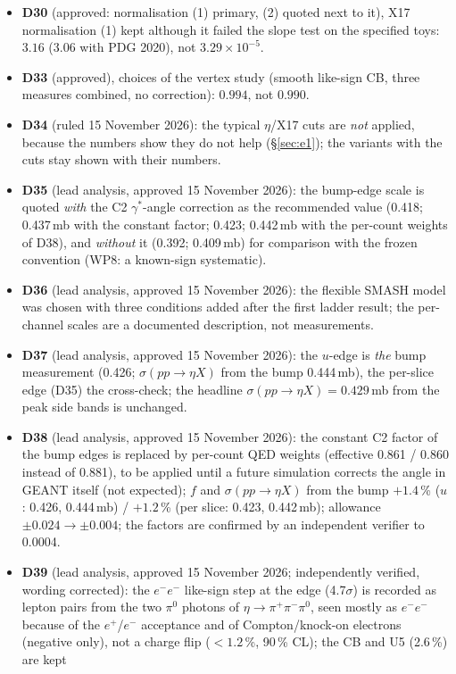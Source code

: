 \documentclass[11pt,a4paper]{article}
\newcommand{\piz}{\ensuremath{\pi^{0}}\xspace}
\newcommand{\pipi}{\ensuremath{\pi^{+}\pi^{-}}\xspace}
\newcommand{\sigeta}{\ensuremath{\sigma(pp\to\eta X)}\xspace}
\begin{document}
\begin{itemize}
\item \textbf{D30} (approved: normalisation (1) primary, (2) quoted next to it), X17 normalisation (1) kept although it failed the slope test on the specified toys: $3.16$ (3.06 with
      PDG 2020), not $3.29\times10^{-5}$.
\item \textbf{D33} (approved), choices of the vertex study (smooth like-sign CB, three measures combined, no correction): $0.994$, not
      $0.990$.
\item \textbf{D34} (ruled 15 November 2026): the typical $\eta$/X17 cuts are \emph{not} applied, because the numbers show they do not help
      (\S\ref{sec:e1}); the variants with the cuts stay shown with their numbers.
\item \textbf{D35} (lead analysis, approved 15 November 2026): the bump-edge scale is quoted \emph{with} the C2 $\gamma^*$-angle correction as the recommended value
      (0.418; 0.437\,mb with the constant factor; 0.423; 0.442\,mb with the per-count weights of D38), and \emph{without} it (0.392; 0.409\,mb) for comparison with the frozen convention (WP8: a known-sign systematic).
\item \textbf{D36} (lead analysis, approved 15 November 2026): the flexible SMASH model was chosen with three conditions added after the first ladder result; the
      per-channel scales are a documented description, not measurements.
\item \textbf{D37} (lead analysis, approved 15 November 2026): the $u$-edge is \emph{the} bump measurement (0.426; \sigeta from the bump
      0.444\,mb), the per-slice edge (D35) the cross-check; the headline \sigeta $=0.429$\,mb from the peak side bands is unchanged.
\item \textbf{D38} (lead analysis, approved 15 November 2026): the constant C2 factor of the bump edges is replaced by per-count QED weights
      (effective 0.861 / 0.860 instead of 0.881), to be applied until a future simulation corrects the angle in GEANT itself (not expected);
      $f$ and \sigeta from the bump $+1.4$\,\% ($u$: 0.426, 0.444\,mb) / $+1.2$\,\% (per slice: 0.423, 0.442\,mb); allowance
      $\pm0.024\to\pm0.004$; the factors are confirmed by an independent verifier to 0.0004.
\item \textbf{D39} (lead analysis, approved 15 November 2026; independently verified, wording corrected): the $e^-e^-$ like-sign step at the edge
      (4.7$\sigma$) is recorded as lepton pairs from the two \piz photons of $\eta\to\pipi\piz$, seen mostly as $e^-e^-$ because of the $e^+$/$e^-$
      acceptance and of Compton/knock-on electrons (negative only), not a charge flip ($<1.2$\,\%, 90\,\% CL); the CB and U5 (2.6\,\%) are kept

\end{itemize}
\end{document}

